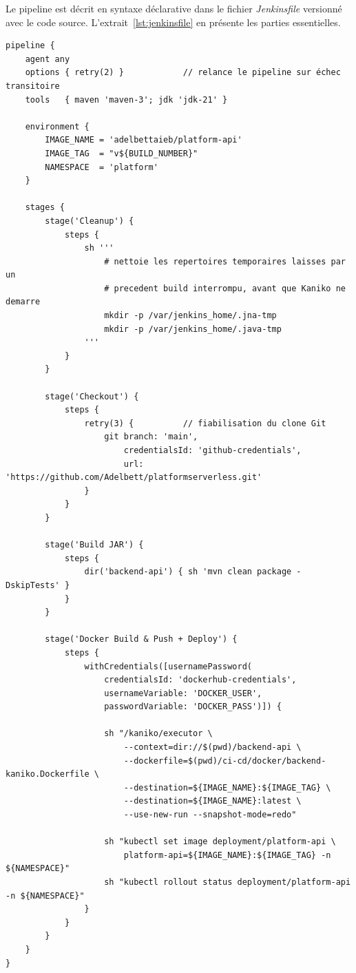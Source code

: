 Le pipeline est décrit en syntaxe déclarative dans le fichier \textit{Jenkinsfile} versionné avec le code source. L'extrait~\ref{lst:jenkinsfile} en présente les parties essentielles.

\begin{lstlisting}[style=yamlstyle, language={}, basicstyle=\ttfamily\scriptsize,
  caption={Extrait du \textit{Jenkinsfile} du pipeline \texttt{platform-backend}},
  label={lst:jenkinsfile}]
pipeline {
    agent any
    options { retry(2) }            // relance le pipeline sur échec transitoire
    tools   { maven 'maven-3'; jdk 'jdk-21' }

    environment {
        IMAGE_NAME = 'adelbettaieb/platform-api'
        IMAGE_TAG  = "v${BUILD_NUMBER}"
        NAMESPACE  = 'platform'
    }

    stages {
        stage('Cleanup') {
            steps {
                sh '''
                    # nettoie les repertoires temporaires laisses par un
                    # precedent build interrompu, avant que Kaniko ne demarre
                    mkdir -p /var/jenkins_home/.jna-tmp
                    mkdir -p /var/jenkins_home/.java-tmp
                '''
            }
        }

        stage('Checkout') {
            steps {
                retry(3) {          // fiabilisation du clone Git
                    git branch: 'main',
                        credentialsId: 'github-credentials',
                        url: 'https://github.com/Adelbett/platformserverless.git'
                }
            }
        }

        stage('Build JAR') {
            steps {
                dir('backend-api') { sh 'mvn clean package -DskipTests' }
            }
        }

        stage('Docker Build & Push + Deploy') {
            steps {
                withCredentials([usernamePassword(
                    credentialsId: 'dockerhub-credentials',
                    usernameVariable: 'DOCKER_USER',
                    passwordVariable: 'DOCKER_PASS')]) {

                    sh "/kaniko/executor \
                        --context=dir://$(pwd)/backend-api \
                        --dockerfile=$(pwd)/ci-cd/docker/backend-kaniko.Dockerfile \
                        --destination=${IMAGE_NAME}:${IMAGE_TAG} \
                        --destination=${IMAGE_NAME}:latest \
                        --use-new-run --snapshot-mode=redo"

                    sh "kubectl set image deployment/platform-api \
                        platform-api=${IMAGE_NAME}:${IMAGE_TAG} -n ${NAMESPACE}"
                    sh "kubectl rollout status deployment/platform-api -n ${NAMESPACE}"
                }
            }
        }
    }
}
\end{lstlisting}

